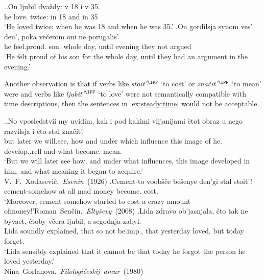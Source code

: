 \ex.\label{ex:steady:adv}\ag.On ljubil dva\v{z}dy: v 18 i v 35.\\
he love. twice: in 18 and in 35\\
\trans `He loved twice: when he was 18 and when he was 35.'
\bg.On gordilsja synom ves' den', poka ve\v{c}erom oni ne porugalis'.\\
he feel.proud. son. whole day, until evening they not argued\\
\trans `He felt proud of his son for the whole day, until they had an argument in the evening.'

Another observation is that if verbs like \textit{stoit'}$^{\IPF}$ `to cost' or \textit{zna\v{c}it'}$^{\IPF}$ `to mean' were  and verbs like \textit{ljubit'$^{\IPF}$} `to love' were not semantically compatible with time descriptions, then the sentences in \ref{ex:steady:time} would not be acceptable.

\ex.\label{ex:steady:time}\ag.No vposledstvii my uvidim, kak i pod kakimi vlijanijami \`{e}tot obraz u nego razvilsja i \v{c}to stal zna\v{c}it'.\\
but later we will.see, how and under which influence this image of he. develop..refl and what become. mean.\\
\trans `But we will later see how, and under what influences, this image developed in him, and what meaning it began to acquire.'\\\hbox{}\hfill\hbox{V. F. Xodasevi\v{c}. \textit{Esenin} (1926)}
\bg.Cement-to voob\v{s}\v{c}e be\v{s}enye den'gi stal stoit'!\\
cement-somehow {at all} mad money become. cost.\\
\trans `Moreover, cement somehow started to cost a crazy amount of\linebreak money!'\hbox{}\hfill\hbox{Roman Sen\v{c}in. \textit{Elty\v{s}evy} (2008)}
\bg.Lida zdravo ob'jasnjala, \v{c}to tak ne byvaet, \v{c}toby v\v{c}era ljubil, a segodnja zabyl.\\
Lida soundly explained, that so not be.imp., that yesterday loved, but today forget.\\
\trans `Lida sensibly explained that it cannot be that today he forgot the person he loved yesterday.'\\\hbox{}\hfill\hbox{Nina Gorlanova. \textit{Filologi\v{c}eskij amur} (1980)}

